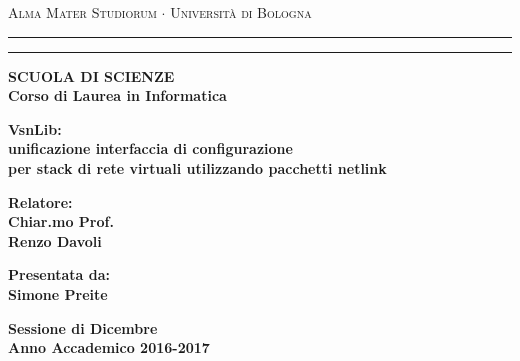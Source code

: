 \documentclass[12pt,a4paper,openright,twoside]{report}
\begin{document}
\begin{titlepage}
\begin{center}
{{\Large{\textsc{Alma Mater Studiorum $\cdot$ Universit\`a di
Bologna}}}} \rule[0.1cm]{15.8cm}{0.1mm}
\rule[0.5cm]{15.8cm}{0.6mm}
{\small{\bf SCUOLA DI SCIENZE\\
Corso di Laurea in Informatica }}
\end{center}
\vspace{15mm}
\begin{center}
{\LARGE{\bf VsnLib:}}\\
\vspace{3mm}
{\LARGE{\bf unificazione interfaccia di configurazione}}\\
{\LARGE{\bf per stack di rete virtuali utilizzando pacchetti netlink}}\\
\end{center}
\vspace{40mm}
\par
\noindent
\begin{minipage}[t]{0.47\textwidth}
{\large{\bf Relatore:\\
Chiar.mo Prof.\\
Renzo Davoli}}
\end{minipage}
\hfill
\begin{minipage}[t]{0.47\textwidth}\raggedleft
{\large{\bf Presentata da:\\
Simone Preite}}
\end{minipage}
\vspace{20mm}
\begin{center}
{\large{\bf Sessione di Dicembre\\%
Anno Accademico 2016-2017}}%
\end{center}
\end{titlepage}
\end{document}
